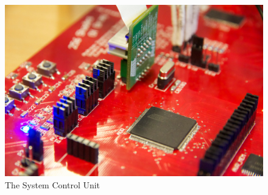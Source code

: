\begin{figure}[h]
  \centering
  \includegraphics[width=\textwidth]{fig/avr/intro-picture.jpg}
  \caption{The System Control Unit}
  \label{fig:scu-intro-picture}
\end{figure}
